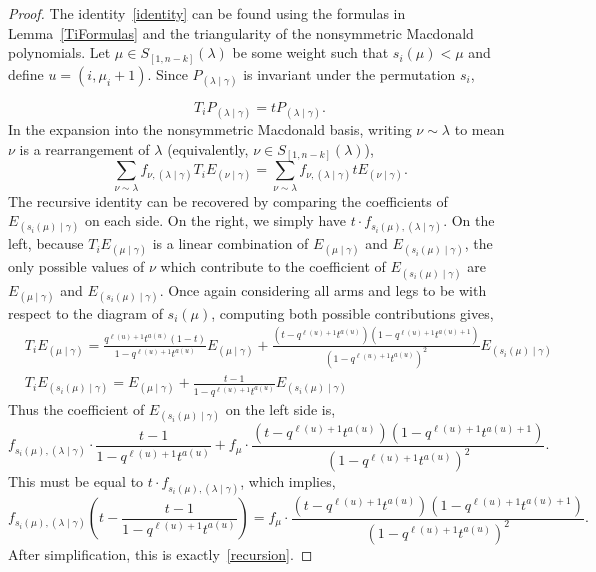\documentclass[ALCO]{cedram}
\newcommand{\PP}{P_{(\lambda \mid \gamma)}}
\newcommand{\nudom}{{( \lambda \mid \gamma )}}
\newcommand{\lambdagamma}{{\nudom}}
\newcommand{\nugamma}{{(\nu \mid \gamma)}}
\newcommand{\mugamma}{{(\mu \mid \gamma)}}
\newcommand{\fnuu}{f_{\nu,\lambdagamma}}
\begin{document}
\begin{proof}
The identity~\eqref{identity} can be found using the formulas in Lemma~\ref{TiFormulas} and the triangularity of the nonsymmetric Macdonald polynomials. Let $\mu \in S_{[1,n-k]}(\lambda)$ be some weight such that $s_i(\mu)<\mu$ and define $u=(i,\mu_{i}+1)$. Since $\PP$ is invariant under the permutation $s_i$,

\[ T_i \PP = t \PP.\]
In the expansion into the nonsymmetric Macdonald basis, writing $\nu \sim \lambda$ to mean $\nu$ is a rearrangement of $\lambda$ (equivalently, $\nu \in S_{[1,n-k]}(\lambda)$),
\[ \sum_{\nu \sim \lambda} \fnuu T_i E_{\nugamma} = \sum_{\nu \sim \lambda} \fnuu t E_{\nugamma}.   \]
The recursive identity can be recovered by comparing the coefficients of $E_{(s_i(\mu) \mid \gamma)}$ on each side. On the right, we simply have $t\cdot f_{s_i(\mu),\lambdagamma}$. On the left, because $T_i E_{(\mu \mid \gamma)}$ is a linear combination of $E_{(\mu \mid \gamma)}$ and $E_{(s_i(\mu) \mid \gamma)}$, the only possible values of $\nu$ which contribute to the coefficient of $E_{(s_i(\mu) \mid \gamma)}$ are $E_\mugamma$ and $E_{(s_i(\mu) \mid \gamma)}$. Once again considering all arms and legs to be with respect to the diagram of $s_i(\mu)$, computing both possible contributions gives,
\begin{align*}
     &T_i E_{\mugamma} =  \frac{q^{\ell(u)+1}t^{a(u)}(1-t)}{1-q^{\ell(u)+1}t^{a(u)}} E_{\mugamma} +  \frac{(t-q^{\ell(u)+1}t^{a(u)})(1-q^{\ell(u)+1}t^{a(u)+1})}{(1-q^{\ell(u)+1}t^{a(u)})^2} E_{(s_i(\mu) \mid \gamma)}\\
    &T_i E_{(s_i(\mu)\mid \gamma)} =  E_{\mugamma} +  \frac{t-1}{1-q^{\ell(u)+1}t^{a(u)}} E_{(s_i(\mu)\mid \gamma)}
\end{align*}
Thus the coefficient of $E_{(s_i(\mu)\mid \gamma)}$ on the left side is,
\[ f_{s_i(\mu),\lambdagamma} \cdot \frac{t-1}{1-q^{\ell(u)+1}t^{a(u)}} + f_\mu  \cdot \frac{(t-q^{\ell(u)+1}t^{a(u)})(1-q^{\ell(u)+1}t^{a(u)+1})}{(1-q^{\ell(u)+1}t^{a(u)})^2}.\]
This must be equal to $t\cdot f_{s_i(\mu),\lambdagamma}$, which implies,
\[ f_{s_i(\mu),\lambdagamma} \left( t-\frac{t-1}{1-q^{\ell(u)+1}t^{a(u)}} \right) = f_\mu  \cdot \frac{(t-q^{\ell(u)+1}t^{a(u)})(1-q^{\ell(u)+1}t^{a(u)+1})}{(1-q^{\ell(u)+1}t^{a(u)})^2}.\]
After simplification, this is exactly~\eqref{recursion}.
\end{proof}
\end{document}
